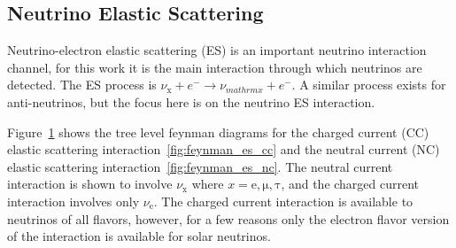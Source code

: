 \subsection{Neutrino Elastic Scattering}
\begin{figure}
    \begin{subfigure}[t]{0.53\textwidth}
        \centering
        \begin{feynman}
        \end{feynman}
    \end{subfigure}
    \begin{subfigure}[t]{0.53\textwidth}
        \centering
        \begin{feynman}
        \end{feynman}
    \end{subfigure}
    \label{fig:feynman_es}
\end{figure}

Neutrino-electron elastic scattering (ES) is an important neutrino interaction
channel, for this work it is the main interaction through which neutrinos are
detected.
The ES process is $\nu_{\mathrm{x}} + e^{-} \rightarrow \nu_{mathrm{x}} +e^{-}$.
A similar process exists for anti-neutrinos, but the focus here is on the
neutrino ES interaction.

Figure~\ref{fig:feynman_es} shows the tree level feynman diagrams for the charged
current (CC) elastic scattering interaction~\ref{fig:feynman_es_cc} and the
neutral current (NC) elastic scattering interaction~\ref{fig:feynman_es_nc}.
The neutral current interaction is shown to involve $\nu_{\mathrm{x}}$ where $x=\mathrm{e, \mu, \tau}$,
and the charged current interaction involves only $\nu_{\mathrm{e}}$.
The charged current interaction is available to neutrinos of all flavors,
however, for a few reasons only the electron flavor version of the interaction
is available for solar neutrinos.

